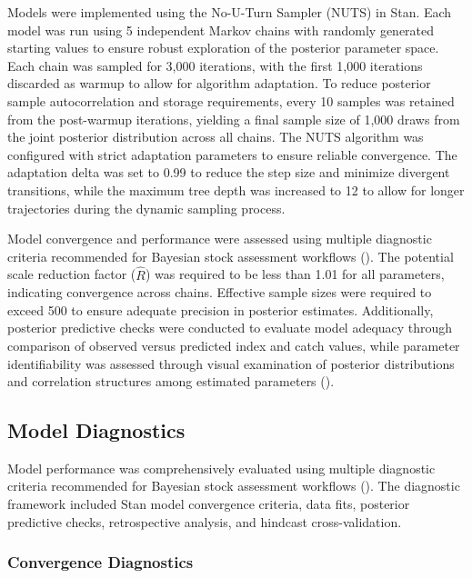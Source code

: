 \documentclass[
  11pt,
]{SCreport}
\begin{document}
Models were implemented using the No-U-Turn Sampler (NUTS) in Stan. Each
model was run using 5 independent Markov chains with randomly generated
starting values to ensure robust exploration of the posterior parameter
space. Each chain was sampled for 3,000 iterations, with the first 1,000
iterations discarded as warmup to allow for algorithm adaptation. To
reduce posterior sample autocorrelation and storage requirements, every
10 samples was retained from the post-warmup iterations, yielding a
final sample size of 1,000 draws from the joint posterior distribution
across all chains. The NUTS algorithm was configured with strict
adaptation parameters to ensure reliable convergence. The adaptation
delta was set to 0.99 to reduce the step size and minimize divergent
transitions, while the maximum tree depth was increased to 12 to allow
for longer trajectories during the dynamic sampling process.

Model convergence and performance were assessed using multiple
diagnostic criteria recommended for Bayesian stock assessment workflows
(). The potential
scale reduction factor (\(\hat{R}\)) was required to be less than 1.01
for all parameters, indicating convergence across chains. Effective
sample sizes were required to exceed 500 to ensure adequate precision in
posterior estimates. Additionally, posterior predictive checks were
conducted to evaluate model adequacy through comparison of observed
versus predicted index and catch values, while parameter identifiability
was assessed through visual examination of posterior distributions and
correlation structures among estimated parameters
().

\subsection{Model Diagnostics}\label{sec-model-diagnostics}

Model performance was comprehensively evaluated using multiple
diagnostic criteria recommended for Bayesian stock assessment workflows
(). The diagnostic
framework included Stan model convergence criteria, data fits, posterior
predictive checks, retrospective analysis, and hindcast
cross-validation.

\subsubsection{Convergence
Diagnostics}\label{sec-convergence-diagnostics}
\end{document}
